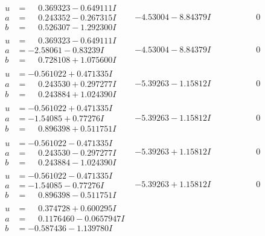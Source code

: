 \documentclass[1p]{elsarticle_modified}
\theoremstyle{definition}
\begin{document}
$$\begin{array}{c|c|c}
\begin{aligned}
u &= \phantom{-}0.369323 - 0.649111 I \\
a &= \phantom{-}0.243352 - 0.267315 I \\
b &= \phantom{-}0.526307 - 1.292300 I\end{aligned}
 & -4.53004 - 8.84379 I & \phantom{-0.000000 } 0 \\ \hline\begin{aligned}
u &= \phantom{-}0.369323 - 0.649111 I \\
a &= -2.58061 - 0.83239 I \\
b &= \phantom{-}0.728108 + 1.075600 I\end{aligned}
 & -4.53004 - 8.84379 I & \phantom{-0.000000 } 0 \\ \hline\begin{aligned}
u &= -0.561022 + 0.471335 I \\
a &= \phantom{-}0.243530 + 0.297277 I \\
b &= \phantom{-}0.243884 + 1.024390 I\end{aligned}
 & -5.39263 - 1.15812 I & \phantom{-0.000000 } 0 \\ \hline\begin{aligned}
u &= -0.561022 + 0.471335 I \\
a &= -1.54085 + 0.77276 I \\
b &= \phantom{-}0.896398 + 0.511751 I\end{aligned}
 & -5.39263 - 1.15812 I & \phantom{-0.000000 } 0 \\ \hline\begin{aligned}
u &= -0.561022 - 0.471335 I \\
a &= \phantom{-}0.243530 - 0.297277 I \\
b &= \phantom{-}0.243884 - 1.024390 I\end{aligned}
 & -5.39263 + 1.15812 I & \phantom{-0.000000 } 0 \\ \hline\begin{aligned}
u &= -0.561022 - 0.471335 I \\
a &= -1.54085 - 0.77276 I \\
b &= \phantom{-}0.896398 - 0.511751 I\end{aligned}
 & -5.39263 + 1.15812 I & \phantom{-0.000000 } 0 \\ \hline\begin{aligned}
u &= \phantom{-}0.374728 + 0.600295 I \\
a &= \phantom{-}0.1176460 - 0.0657947 I \\
b &= -0.587436 - 1.139780 I\end{aligned}

\end{array}$$
\end{document}
